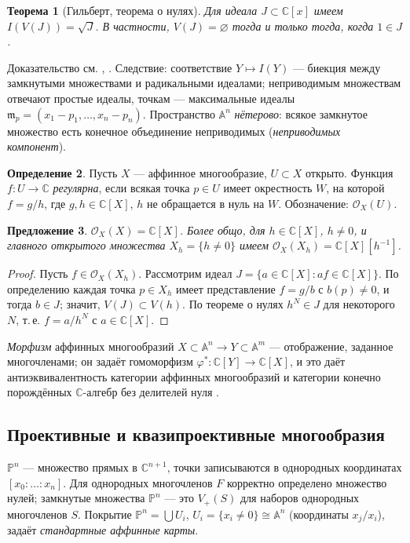 \documentclass[11pt,a4paper]{article}
\theoremstyle{plain}
\newtheorem{theorem}{Теорема}[section]
\newtheorem{proposition}[theorem]{Предложение}
\theoremstyle{definition}
\newtheorem{definition}[theorem]{Определение}
\theoremstyle{remark}
\renewcommand{\C}{\mathbb{C}}
\newcommand{\PP}{\mathbb{P}}
\newcommand{\A}{\mathbb{A}}
\newcommand{\cO}{\mathcal{O}}
\newcommand{\mm}{\mathfrak{m}}
\begin{document}
\begin{theorem}[Гильберт, теорема о нулях]\label{thm:Nullstellensatz}
Для идеала $J\subset \C[x]$ имеем $I(V(J))=\sqrt J$. В частности, $V(J)=\varnothing$ тогда и
только тогда, когда $1\in J$.
\end{theorem}
Доказательство см. \cite[гл.~I, \S\,2]{Sh}, \cite[I.1.3A]{Ha}. Следствие: соответствие
$Y\mapsto I(Y)$ --- биекция между замкнутыми множествами и радикальными идеалами; неприводимым
множествам отвечают простые идеалы, точкам --- максимальные идеалы
$\mm_p=(x_1-p_1,\dots,x_n-p_n)$. Пространство $\A^n$ \emph{нётерово}: всякое замкнутое множество
есть конечное объединение неприводимых (\emph{неприводимых компонент}).

\begin{definition}
Пусть $X$ --- аффинное многообразие, $U\subset X$ открыто. Функция $f\colon U\to \C$
\emph{регулярна}, если всякая точка $p\in U$ имеет окрестность $W$, на которой $f=g/h$, где
$g,h\in \C[X]$, $h$ не обращается в нуль на $W$. Обозначение: $\cO_X(U)$.
\end{definition}

\begin{proposition}\label{prop:OX=CX}
$\cO_X(X)=\C[X]$. Более общо, для $h\in\C[X]$, $h\ne0$, и главного открытого множества
$X_h=\{h\neq 0\}$ имеем $\cO_X(X_h)=\C[X][h^{-1}]$.
\end{proposition}
\begin{proof}
Пусть $f\in\cO_X(X_h)$. Рассмотрим идеал $J=\{a\in \C[X]: af\in \C[X]\}$. По определению каждая
точка $p\in X_h$ имеет представление $f=g/b$ с $b(p)\ne 0$, и тогда $b\in J$; значит,
$V(J)\subset V(h)$. По теореме о нулях $h^N\in J$ для некоторого $N$, т.\,е. $f=a/h^N$ с
$a\in\C[X]$.
\end{proof}

\emph{Морфизм} аффинных многообразий $X\subset\A^n\to Y\subset \A^m$ --- отображение, заданное
многочленами; он задаёт гомоморфизм $\varphi^*\colon \C[Y]\to\C[X]$, и это даёт
антиэквивалентность категории аффинных многообразий и категории конечно порождённых
$\C$-алгебр без делителей нуля \cite[I.3]{Ha}.

\subsection{Проективные и квазипроективные многообразия}

$\PP^n$ --- множество прямых в $\C^{n+1}$, точки записываются в однородных координатах
$[x_0:\dots:x_n]$. Для однородных многочленов $F$ корректно определено множество нулей; замкнутые
множества $\PP^n$ --- это $V_+(S)$ для наборов однородных многочленов $S$. Покрытие
$\PP^n=\bigcup U_i$, $U_i=\{x_i\neq 0\}\cong \A^n$ (координаты $x_j/x_i$), задаёт
\emph{стандартные аффинные карты}.
\end{document}
